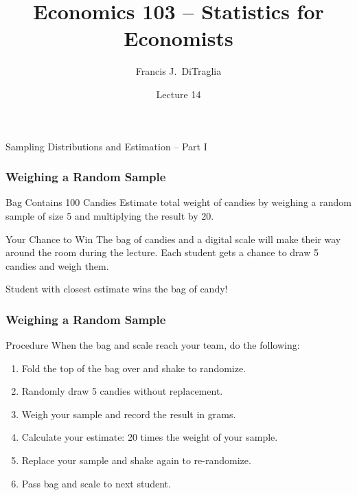 \documentclass[handout]{beamer}
\title[Econ 103]{Economics 103 -- Statistics for Economists}
\author[F. DiTraglia]{Francis J.\ DiTraglia}
\institute{University of Pennsylvania}
\date{Lecture 14}
\begin{document}
 

\begin{frame}[plain]
	\titlepage 
	

\end{frame} 




\begin{frame}
\begin{center}
\Huge Sampling Distributions and Estimation -- Part I
\end{center}
\end{frame}


\begin{frame}
\frametitle{Weighing a Random Sample}
\begin{block}{Bag Contains 100 Candies}
Estimate total weight of candies by weighing a random sample of size 5 and multiplying the result by 20.
\end{block}
\begin{block}{Your Chance to Win}
The bag of candies and a digital scale will make their way around the room \alert{during the lecture}. Each student gets a chance to draw 5 candies and weigh them.
\end{block}
\begin{alertblock}{Student with closest estimate wins the bag of candy!}
\end{alertblock}

\end{frame}
\begin{frame}
\frametitle{Weighing a Random Sample}
\begin{block}{Procedure}
When the bag and scale reach your team, do the following:
\end{block}
\begin{enumerate}
\item Fold the top of the bag over and shake to randomize.
\item Randomly draw 5 candies \alert{without replacement}.
\item Weigh your sample and record the result \alert{in grams}.
\item Calculate your \alert{estimate: 20 times the weight of your sample.}
\item Replace your sample and shake again to re-randomize.
\item Pass bag and scale to next student.
\end{enumerate}
\end{frame}
\end{document}
